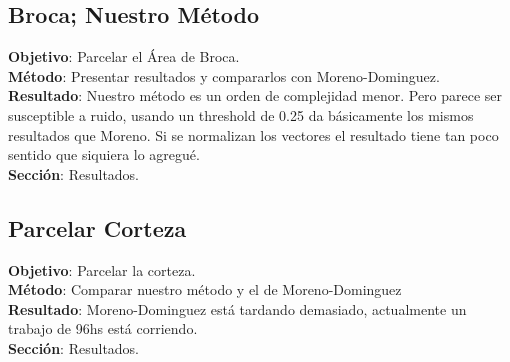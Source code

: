 \subsection{Broca; Nuestro M\'etodo}
\textbf{Objetivo}:  Parcelar el \'Area de Broca.\\
\textbf{M\'etodo}:  Presentar resultados y compararlos con Moreno-Dominguez. \\
\textbf{Resultado}: Nuestro m\'etodo es un orden de complejidad menor. Pero 
                    parece ser susceptible a ruido, usando un threshold de 0.25
                    da b\'asicamente los mismos resultados que Moreno. 
                    Si se normalizan los vectores el resultado tiene tan poco 
                    sentido que siquiera lo agregu\'e. \\
\textbf{Secci\'on}: Resultados.\\                    
                    
\subsection{Parcelar Corteza}
\textbf{Objetivo}:  Parcelar la corteza.\\
\textbf{M\'etodo}:  Comparar nuestro m\'etodo y el de Moreno-Dominguez \\
\textbf{Resultado}: Moreno-Dominguez est\'a tardando demasiado, actualmente un 
                    trabajo de 96hs est\'a corriendo.\\
\textbf{Secci\'on}: Resultados.\\                                        


\begin{comment}

\end{comment}
